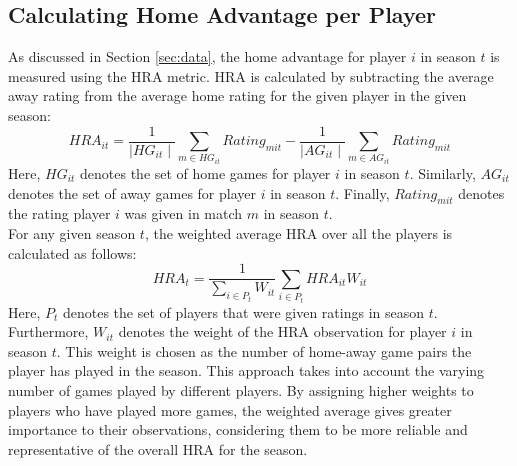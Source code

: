 \subsection{Calculating Home Advantage per Player}
As discussed in Section \ref{sec:data}, the home advantage for player $i$ in season $t$ is measured using the HRA metric. HRA is calculated by subtracting the average away rating from the average home rating for the given player in the given season:
\begin{equation}
    \label{eq:calc_hra_it}
    HRA_{it} = \frac{1}{\mid HG_{it} \mid}\sum_{m \in HG_{it}} Rating_{mit} - \frac{1}{\mid AG_{it} \mid}\sum_{m \in AG_{it}} Rating_{mit}
\end{equation}
\noindent
Here, $HG_{it}$ denotes the set of home games for player $i$ in season $t$. Similarly, $AG_{it}$ denotes the set of away games for player $i$ in season $t$. Finally, $Rating_{mit}$ denotes the rating player $i$ was given in match $m$ in season $t$. \\

\noindent
For any given season $t$, the weighted average HRA over all the players is calculated as follows:
\begin{equation}
    \label{eq:calc_average_hra}
    HRA_{t} = \frac{1}{\sum_{i \in P_t} W_{it}}\sum_{i \in P_t} HRA_{it} W_{it}
\end{equation}
\noindent
Here, $P_t$ denotes the set of players that were given ratings in season $t$. Furthermore, $W_{it}$ denotes the weight of the HRA observation for player $i$ in season $t$. This weight is chosen as the number of home-away game pairs the player has played in the season. This approach takes into account the varying number of games played by different players. By assigning higher weights to players who have played more games, the weighted average gives greater importance to their observations, considering them to be more reliable and representative of the overall HRA for the season.

